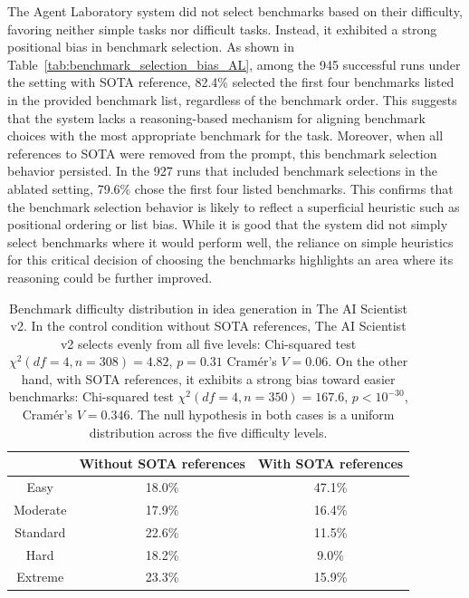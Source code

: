 \documentclass[10pt]{article}
\begin{document}
The Agent Laboratory system did not select benchmarks based on their difficulty, favoring neither simple tasks nor difficult tasks. Instead, it exhibited a strong positional bias in benchmark selection.
As shown in Table~\ref{tab:benchmark_selection_bias_AL}, among the 945 successful runs under the setting with SOTA reference, 82.4\% selected the first four benchmarks listed in the provided benchmark list, regardless of the benchmark order. This suggests that the system lacks a reasoning-based mechanism for aligning benchmark choices with the most appropriate benchmark for the task. Moreover, when all references to SOTA were removed from the prompt, this benchmark selection behavior persisted. In the 927 runs that included benchmark selections in the ablated setting, 79.6\% chose the first four listed benchmarks. This confirms that the benchmark selection behavior is likely to reflect a superficial heuristic such as positional ordering or list bias. 
While it is good that the system did not simply select benchmarks where it would perform well, the reliance on simple heuristics for this critical decision of choosing the benchmarks highlights an area where its reasoning could be further improved.

\begin{table}[tb]
    \centering
    \begin{tabular}{c|c|c}
    \toprule
           & Without SOTA references & With SOTA references  \\
    \midrule
        Easy &  18.0\% & 47.1\% \\ \hline
        Moderate &  17.9\% &  16.4\% \\ \hline
        Standard & 22.6\% & 11.5\% \\ \hline
        Hard &  18.2\%  & 9.0\% \\ \hline
        Extreme &  23.3\% &  15.9\%\\
    \bottomrule
    \end{tabular}
    \caption{Benchmark difficulty distribution in idea generation in The AI Scientist v2. In the control condition without SOTA references, The AI Scientist v2 selects evenly from all five levels:  Chi-squared test $\chi^2(df=4,n=308) = 4.82$, $p=0.31$ Cramér's $V=0.06$. On the other hand, with SOTA references, it exhibits a strong bias toward easier benchmarks:  Chi-squared test $\chi^2(df=4,n=350) = 167.6$, $p<10^{-30}$, Cramér's $V=0.346$. The null hypothesis in both cases is a uniform distribution across the five difficulty levels.}
    \label{tab:benchmark_selection_bias_AI_S_v2}
\end{table}
\end{document}

